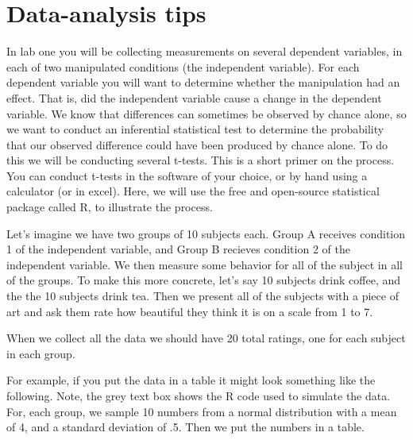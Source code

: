 
\section{Data-analysis tips}\label{lab-1-data-analysis-tips}

In lab one you will be collecting measurements on several dependent
variables, in each of two manipulated conditions (the independent
variable). For each dependent variable you will want to determine
whether the manipulation had an effect. That is, did the independent
variable cause a change in the dependent variable. We know that
differences can sometimes be observed by chance alone, so we want to
conduct an inferential statistical test to determine the probability
that our observed difference could have been produced by chance alone.
To do this we will be conducting several t-tests. This is a short primer
on the process. You can conduct t-tests in the software of your choice,
or by hand using a calculator (or in excel). Here, we will use the free
and open-source statistical package called R, to illustrate the process.

Let's imagine we have two groups of 10 subjects each. Group A receives
condition 1 of the independent variable, and Group B recieves condition
2 of the independent variable. We then measure some behavior for all of
the subject in all of the groups. To make this more concrete, let's say
10 subjects drink coffee, and the the 10 subjects drink tea. Then we
present all of the subjects with a piece of art and ask them rate how
beautiful they think it is on a scale from 1 to 7.

When we collect all the data we should have 20 total ratings, one for
each subject in each group.

For example, if you put the data in a table it might look something like
the following. Note, the grey text box shows the R code used to simulate
the data. For, each group, we sample 10 numbers from a normal
distribution with a mean of 4, and a standard deviation of .5. Then we
put the numbers in a table.

\begin{Shaded}
\begin{Highlighting}[]
\NormalTok{(}\NormalTok{(}\NormalTok{,}\NormalTok{))}
\NormalTok{(}\NormalTok{(}\NormalTok{,}\NormalTok{))}
\NormalTok{)}
\end{Highlighting}
\end{Shaded}

